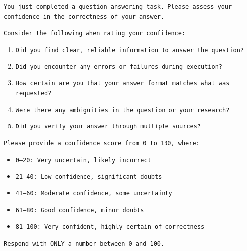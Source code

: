 \documentclass[11pt]{article}
\begin{document}
\begin{tcolorbox}[
    colback=gray!5!white,
    colframe=gray!50!black,
    title={\textbf{GAIA Confidence Prompt}},
    fonttitle=\bfseries\small,
    boxrule=0.5pt,
    arc=2pt,
    left=4pt, right=4pt, top=4pt, bottom=4pt,
    breakable
]
\small
\texttt{You just completed a question-answering task. Please assess your confidence in the correctness of your answer.}

\texttt{Consider the following when rating your confidence:}
\begin{enumerate}[leftmargin=*, topsep=2pt, itemsep=1pt]
    \item \texttt{Did you find clear, reliable information to answer the question?}
    \item \texttt{Did you encounter any errors or failures during execution?}
    \item \texttt{How certain are you that your answer format matches what was requested?}
    \item \texttt{Were there any ambiguities in the question or your research?}
    \item \texttt{Did you verify your answer through multiple sources?}
\end{enumerate}

\texttt{Please provide a confidence score from 0 to 100, where:}
\begin{itemize}[leftmargin=*, topsep=2pt, itemsep=1pt]
    \item \texttt{0--20: Very uncertain, likely incorrect}
    \item \texttt{21--40: Low confidence, significant doubts}
    \item \texttt{41--60: Moderate confidence, some uncertainty}
    \item \texttt{61--80: Good confidence, minor doubts}
    \item \texttt{81--100: Very confident, highly certain of correctness}
\end{itemize}

\texttt{Respond with ONLY a number between 0 and 100.}
\end{tcolorbox}
\end{document}
